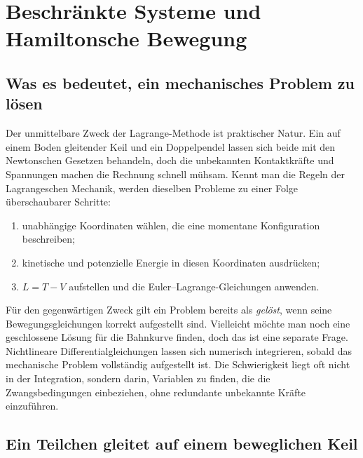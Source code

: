 \chapter{Beschränkte Systeme und Hamiltonsche Bewegung}


\section{Was es bedeutet, ein mechanisches Problem zu lösen}

Der unmittelbare Zweck der Lagrange-Methode ist praktischer Natur. Ein auf einem Boden gleitender Keil und ein Doppelpendel lassen sich beide mit den Newtonschen Gesetzen behandeln, doch die unbekannten Kontaktkräfte und Spannungen machen die Rechnung schnell mühsam. Kennt man die Regeln der Lagrangeschen Mechanik, werden dieselben Probleme zu einer Folge überschaubarer Schritte:
\begin{enumerate}
  \item unabhängige Koordinaten wählen, die eine momentane Konfiguration beschreiben;
  \item kinetische und potenzielle Energie in diesen Koordinaten ausdrücken;
  \item \(L=T-V\) aufstellen und die Euler--Lagrange-Gleichungen anwenden.
\end{enumerate}

Für den gegenwärtigen Zweck gilt ein Problem bereits als \emph{gelöst}, wenn seine Bewegungsgleichungen korrekt aufgestellt sind. Vielleicht möchte man noch eine geschlossene Lösung für die Bahnkurve finden, doch das ist eine separate Frage. Nichtlineare Differentialgleichungen lassen sich numerisch integrieren, sobald das mechanische Problem vollständig aufgestellt ist. Die Schwierigkeit liegt oft nicht in der Integration, sondern darin, Variablen zu finden, die die Zwangsbedingungen einbeziehen, ohne redundante unbekannte Kräfte einzuführen.

\section{Ein Teilchen gleitet auf einem beweglichen Keil}

